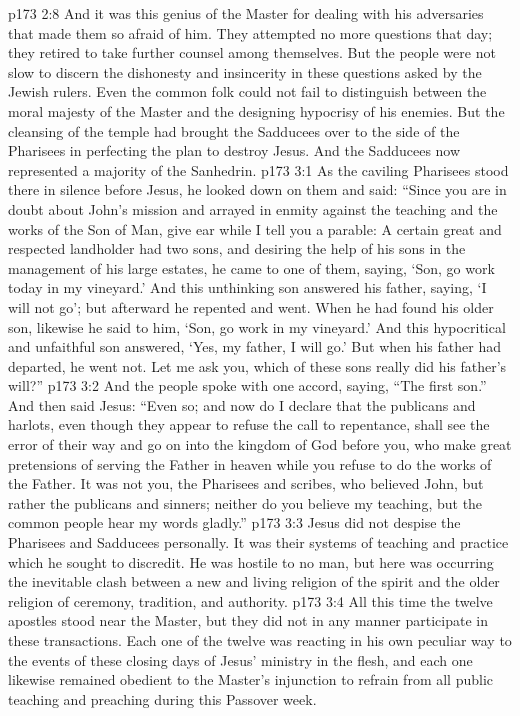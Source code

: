 \vs p173 2:8 And it was this genius of the Master for dealing with his adversaries that made them so afraid of him. They attempted no more questions that day; they retired to take further counsel among themselves. But the people were not slow to discern the dishonesty and insincerity in these questions asked by the Jewish rulers. Even the common folk could not fail to distinguish between the moral majesty of the Master and the designing hypocrisy of his enemies. But the cleansing of the temple had brought the Sadducees over to the side of the Pharisees in perfecting the plan to destroy Jesus. And the Sadducees now represented a majority of the Sanhedrin.
\vs p173 3:1 As the caviling Pharisees stood there in silence before Jesus, he looked down on them and said: \textcolor{ubdarkred}{“Since you are in doubt about John’s mission and arrayed in enmity against the teaching and the works of the Son of Man, give ear while I tell you a parable: A certain great and respected landholder had two sons, and desiring the help of his sons in the management of his large estates, he came to one of them, saying, ‘Son, go work today in my vineyard.’ And this unthinking son answered his father, saying, ‘I will not go’; but afterward he repented and went. When he had found his older son, likewise he said to him, ‘Son, go work in my vineyard.’ And this hypocritical and unfaithful son answered, ‘Yes, my father, I will go.’ But when his father had departed, he went not. Let me ask you, which of these sons really did his father’s will?”}
\vs p173 3:2 And the people spoke with one accord, saying, “The first son.” And then said Jesus: \textcolor{ubdarkred}{“Even so; and now do I declare that the publicans and harlots, even though they appear to refuse the call to repentance, shall see the error of their way and go on into the kingdom of God before you, who make great pretensions of serving the Father in heaven while you refuse to do the works of the Father. It was not you, the Pharisees and scribes, who believed John, but rather the publicans and sinners; neither do you believe my teaching, but the common people hear my words gladly.”}
\vs p173 3:3 Jesus did not despise the Pharisees and Sadducees personally. It was their systems of teaching and practice which he sought to discredit. He was hostile to no man, but here was occurring the inevitable clash between a new and living religion of the spirit and the older religion of ceremony, tradition, and authority.
\vs p173 3:4 All this time the twelve apostles stood near the Master, but they did not in any manner participate in these transactions. Each one of the twelve was reacting in his own peculiar way to the events of these closing days of Jesus’ ministry in the flesh, and each one likewise remained obedient to the Master’s injunction to refrain from all public teaching and preaching during this Passover week.
